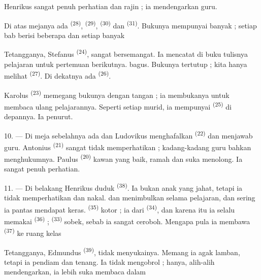 Henrikus sangat penuh perhatian dan rajin ; ia mendengarkan guru.

Di atas mejanya ada  \textsuperscript{(28)},
 \textsuperscript{(29)}, 
\textsuperscript{(30)} dan  \textsuperscript{(31)}.
Bukunya mempunyai banyak  ; setiap bab berisi beberapa
 dan setiap  banyak 

Tetangganya, Stefanus \textsuperscript{(24)}, sangat bersemangat. Ia
mencatat di buku tulisnya pelajaran untuk pertemuan berikutnya.
 bagus. Bukunya tertutup ; kita hanya melihat
 \textsuperscript{(27)}. Di dekatnya ada
 \textsuperscript{(26)}.

Karolus \textsuperscript{(23)} memegang bukunya dengan tangan ; ia
membukanya untuk membaca ulang pelajarannya. Seperti setiap murid, ia
mempunyai  \textsuperscript{(25)} di depannya. Ia
penurut.

10. --- Di meja sebelahnya ada  
dan  Ludovikus menghafalkan 
\textsuperscript{(22)} dan menjawab 
guru. Antonius \textsuperscript{(21)} sangat tidak memperhatikan ;
kadang-kadang guru bahkan menghukumnya. Paulus
\textsuperscript{(20)} kawan yang baik, ramah dan suka menolong. Ia
sangat penuh perhatian.

\VUsaut{4.2mm}
\VUsaut{3.2mm}

11. --- Di belakang Henrikus duduk 
\textsuperscript{(38)}. Ia bukan anak yang jahat, tetapi ia
 tidak memperhatikan dan nakal.
 dan  menimbulkan
 selama pelajaran, dan sering ia pantas mendapat
 keras.  \textsuperscript{(35)}
kotor ; ia  dari 
\textsuperscript{(34)}, dan karena itu ia selalu memakai  \textsuperscript{(36)} ; 
\textsuperscript{(33)} sobek, sebab ia sangat ceroboh. Mengapa pula ia
membawa  \textsuperscript{(37)} ke ruang kelas

Tetangganya, Edmundus \textsuperscript{(39)}, tidak menyukainya.
Memang ia agak lamban, tetapi ia pendiam dan tenang. Ia tidak
mengobrol ; hanya, alih-alih mendengarkan, ia lebih suka membaca
 dalam 

